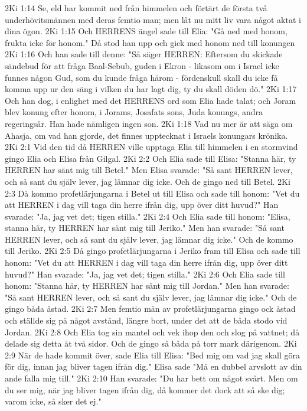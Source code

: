 2Ki 1:14  Se, eld har kommit ned från himmelen och förtärt de första två underhövitsmännen med deras femtio man; men låt nu mitt liv vara något aktat i dina ögon.
2Ki 1:15  Och HERRENS ängel sade till Elia: "Gå ned med honom, frukta icke för honom." Då stod han upp och gick med honom ned till konungen
2Ki 1:16  Och han sade till denne: "Så säger HERREN: Eftersom du skickade sändebud för att fråga Baal-Sebub, guden i Ekron - likasom om i Israel icke funnes någon Gud, som du kunde fråga härom - fördenskull skall du icke få komma upp ur den säng i vilken du har lagt dig, ty du skall döden dö."
2Ki 1:17  Och han dog, i enlighet med det HERRENS ord som Elia hade talat; och Joram blev konung efter honom, i Jorams, Josafats sons, Juda konungs, andra regeringsår. Han hade nämligen ingen son.
2Ki 1:18  Vad nu mer är att säga om Ahasja, om vad han gjorde, det finnes upptecknat i Israels konungars krönika.
2Ki 2:1  Vid den tid då HERREN ville upptaga Elia till himmelen i en stormvind gingo Elia och Elisa från Gilgal.
2Ki 2:2  Och Elia sade till Elisa: "Stanna här, ty HERREN har sänt mig till Betel." Men Elisa svarade: "Så sant HERREN lever, och så sant du själv lever, jag lämnar dig icke. Och de gingo ned till Betel.
2Ki 2:3  Då kommo profetlärjungarna i Betel ut till Elisa och sade till honom: "Vet du att HERREN i dag vill taga din herre ifrån dig, upp över ditt huvud?" Han svarade: "Ja, jag vet det; tigen stilla."
2Ki 2:4  Och Elia sade till honom: "Elisa, stanna här, ty HERREN har sänt mig till Jeriko." Men han svarade: "Så sant HERREN lever, och så sant du själv lever, jag lämnar dig icke." Och de kommo till Jeriko.
2Ki 2:5  Då gingo profetlärjungarna i Jeriko fram till Elisa och sade till honom: "Vet du att HERREN i dag vill taga din herre ifrån dig, upp över ditt huvud?" Han svarade: "Ja, jag vet det; tigen stilla."
2Ki 2:6  Och Elia sade till honom: "Stanna här, ty HERREN har sänt mig till Jordan." Men han svarade: "Så sant HERREN lever, och så sant du själv lever, jag lämnar dig icke." Och de gingo båda åstad.
2Ki 2:7  Men femtio män av profetlärjungarna gingo ock åstad och ställde sig på något avstånd, längre bort, under det att de båda stodo vid Jordan.
2Ki 2:8  Och Elia tog sin mantel och vek ihop den och slog på vattnet; då delade sig detta åt två sidor. Och de gingo så båda på torr mark därigenom.
2Ki 2:9  När de hade kommit över, sade Elia till Elisa: "Bed mig om vad jag skall göra för dig, innan jag bliver tagen ifrån dig." Elisa sade "Må en dubbel arvslott av din ande falla mig till."
2Ki 2:10  Han svarade: "Du har bett om något svårt. Men om du ser mig, när jag bliver tagen ifrån dig, då kommer det dock att så ske dig; varom icke, så sker det ej."
